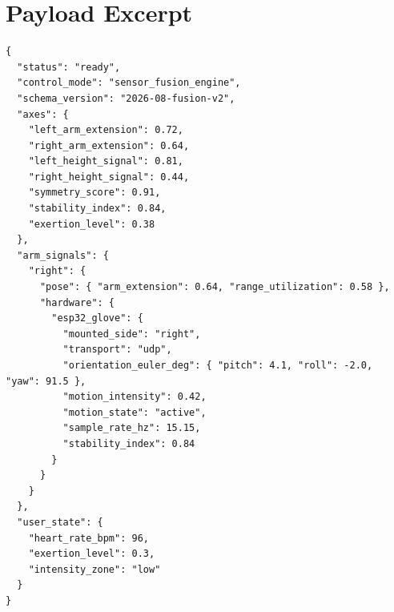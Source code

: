 \documentclass[11pt,a4paper]{article}
\begin{document}
\section{Payload Excerpt}

\begin{lstlisting}
{
  "status": "ready",
  "control_mode": "sensor_fusion_engine",
  "schema_version": "2026-08-fusion-v2",
  "axes": {
    "left_arm_extension": 0.72,
    "right_arm_extension": 0.64,
    "left_height_signal": 0.81,
    "right_height_signal": 0.44,
    "symmetry_score": 0.91,
    "stability_index": 0.84,
    "exertion_level": 0.38
  },
  "arm_signals": {
    "right": {
      "pose": { "arm_extension": 0.64, "range_utilization": 0.58 },
      "hardware": {
        "esp32_glove": {
          "mounted_side": "right",
          "transport": "udp",
          "orientation_euler_deg": { "pitch": 4.1, "roll": -2.0, "yaw": 91.5 },
          "motion_intensity": 0.42,
          "motion_state": "active",
          "sample_rate_hz": 15.15,
          "stability_index": 0.84
        }
      }
    }
  },
  "user_state": {
    "heart_rate_bpm": 96,
    "exertion_level": 0.3,
    "intensity_zone": "low"
  }
}
\end{lstlisting}
\end{document}
